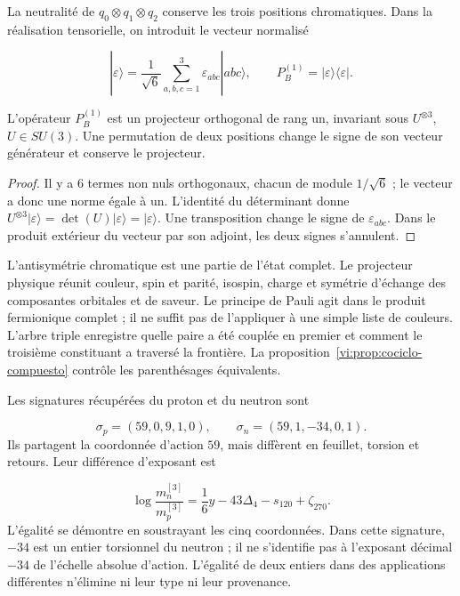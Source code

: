 La neutralité de \(q_0\otimes q_1\otimes q_2\) conserve les trois
positions chromatiques. Dans la réalisation tensorielle, on introduit le vecteur
normalisé

\[
 |\varepsilon\rangle=\frac1{\sqrt6}
 \sum_{a,b,c=1}^3\varepsilon_{abc}|abc\rangle,
 \qquad P_B^{(1)}=|\varepsilon\rangle\langle\varepsilon|.
\]

\begin{proposition}
\label{vi:prop:singlete-barion}
L’opérateur \(P_B^{(1)}\) est un projecteur orthogonal de rang un,
invariant sous \(U^{\otimes3}\), \(U\in SU(3)\). Une permutation
de deux positions change le signe de son vecteur générateur et conserve
le projecteur.

\end{proposition}
\begin{proof}
Il y a \(6\) termes non nuls orthogonaux, chacun de module
\(1/\sqrt6\) ; le vecteur a donc une norme égale à un. L’identité
du déterminant donne
\(U^{\otimes3}|\varepsilon\rangle=
\det(U)|\varepsilon\rangle=|\varepsilon\rangle\).
Une transposition change le signe de \(\varepsilon_{abc}\). Dans le
produit extérieur du vecteur par son adjoint, les deux signes s’annulent.

\end{proof}

L’antisymétrie chromatique est une partie de l’état complet. Le projecteur
physique réunit couleur, spin et parité, isospin, charge et symétrie
d’échange des composantes orbitales et de saveur. Le principe de
Pauli agit dans le produit fermionique complet ; il ne suffit pas de l’appliquer à une
simple liste de couleurs. L’arbre triple enregistre quelle paire a été couplée
en premier et comment le troisième constituant a traversé la frontière. La
proposition~\ref{vi:prop:cociclo-compuesto} contrôle les
parenthésages équivalents.


Les signatures récupérées du proton et du neutron sont

\[
 \sigma_p=(59,0,9,1,0),\qquad
 \sigma_n=(59,1,-34,0,1).
\]
Ils partagent la coordonnée d’action \(59\), mais diffèrent en feuillet,
torsion et retours. Leur différence d’exposant est

\begin{equation}
 \log\frac{m_n^{[3]}}{m_p^{[3]}}
 =\frac16y-43\Delta_4-s_{120}+\zeta_{270}.
 \label{vi:eq:diferencia-neutron-proton}
\end{equation}
L’égalité se démontre en soustrayant les cinq coordonnées. Dans cette signature,
\(-34\) est un entier torsionnel du neutron ; il ne s’identifie pas à
l’exposant décimal \(-34\) de l’échelle absolue d’action. L’égalité
de deux entiers dans des applications différentes n’élimine ni leur type ni leur provenance.


